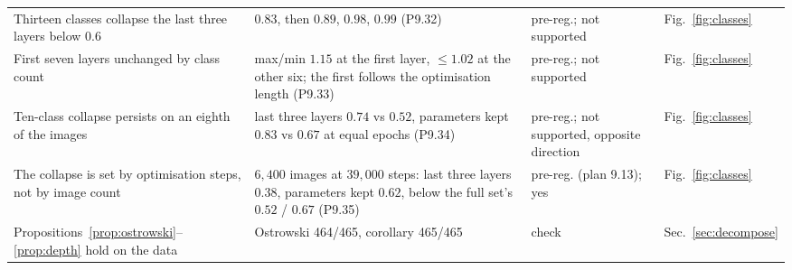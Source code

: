 \documentclass[10pt,journal,compsoc]{IEEEtran}
\begin{document}
\begin{table}[t]
\begin{tabular}{p{4.3cm}p{5.9cm}lp{2.5cm}}
  Thirteen classes collapse the last three layers below $0.6$ & $0.83$, then $0.89$, $0.98$, $0.99$ (P9.32) & pre-reg.; not supported & Fig.~\ref{fig:classes} \\
  First seven layers unchanged by class count & max/min $1.15$ at the first layer, $\le 1.02$ at the other six; the first follows the optimisation length (P9.33) & pre-reg.; not supported & Fig.~\ref{fig:classes} \\
  Ten-class collapse persists on an eighth of the images & last three layers $0.74$ vs $0.52$, parameters kept $0.83$ vs $0.67$ at equal epochs (P9.34) & pre-reg.; not supported, opposite direction & Fig.~\ref{fig:classes} \\
  The collapse is set by optimisation steps, not by image count & $6{,}400$ images at $39{,}000$ steps: last three layers $0.38$, parameters kept $0.62$, below the full set's $0.52$ / $0.67$ (P9.35) & pre-reg. (plan 9.13); yes & Fig.~\ref{fig:classes} \\
  Propositions~\ref{prop:ostrowski}--\ref{prop:depth} hold on the data & Ostrowski 464/465, corollary 465/465 & check & Sec.~\ref{sec:decompose} \\
  \bottomrule
  \end{tabular}
\end{table}

\clearpage\onecolumn
{\scriptsize\setlength{\tabcolsep}{3pt}

}
\twocolumn



\end{document}
